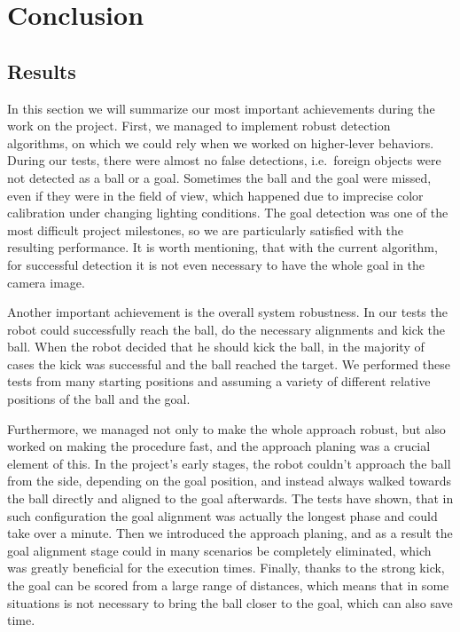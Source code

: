 \chapter{Conclusion}

\section{Results}

In this section we will summarize our most important achievements during the
work on the project. First, we managed to implement robust detection
algorithms, on which we could rely when we worked on higher-lever behaviors.
During our tests, there were almost no false detections, i.e.\ foreign objects
were not detected as a ball or a goal. Sometimes the ball and the goal were
missed, even if they were in the field of view, which happened due to imprecise
color calibration under changing lighting conditions. The goal detection was
one of the most difficult project milestones, so we are particularly satisfied
with the resulting performance. It is worth mentioning, that with the current
algorithm, for successful detection it is not even necessary to have the whole
goal in the camera image.

Another important achievement is the overall system robustness. In our tests
the robot could successfully reach the ball, do the necessary alignments and
kick the ball. When the robot decided that he should kick the ball, in the
majority of cases the kick was successful and the ball reached the target. We
performed these tests from many starting positions and assuming a variety of
different relative positions of the ball and the goal.

Furthermore, we managed not only to make the whole approach robust, but also
worked on making the procedure fast, and the approach planing was a crucial
element of this. In the project's early stages, the robot couldn't approach the
ball from the side, depending on the goal position, and instead always walked
towards the ball directly and aligned to the goal afterwards. The tests have
shown, that in such configuration the goal alignment was actually the longest
phase and could take over a minute. Then we introduced the approach planing,
and as a result the goal alignment stage could in many scenarios be completely
eliminated, which was greatly beneficial for the execution times. Finally,
thanks to the strong kick, the goal can be scored from a large range of
distances, which means that in some situations is not necessary to bring the
ball closer to the goal, which can also save time.

